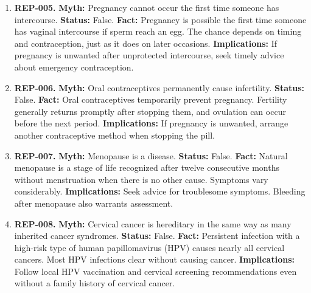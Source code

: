 \documentclass[11pt,oneside]{book}
\begin{document}
\begin{enumerate}[leftmargin=0pt,labelwidth=0pt,labelsep=0pt,itemindent=0pt]
\textbf{Implications:} Bleeding alone does not identify a day when unprotected intercourse is free of pregnancy risk.
\item[] \textbf{REP-005.} \textbf{Myth:} Pregnancy cannot occur the first time someone has intercourse.\newline
\textbf{Status:} False.\newline
\textbf{Fact:} Pregnancy is possible the first time someone has vaginal intercourse if sperm reach an egg. The chance depends on timing and contraception, just as it does on later occasions. \cite{ref253,ref323}\newline
\textbf{Implications:} If pregnancy is unwanted after unprotected intercourse, seek timely advice about emergency contraception.
\item[] \textbf{REP-006.} \textbf{Myth:} Oral contraceptives permanently cause infertility.\newline
\textbf{Status:} False.\newline
\textbf{Fact:} Oral contraceptives temporarily prevent pregnancy. Fertility generally returns promptly after stopping them, and ovulation can occur before the next period. \cite{ref323}\newline
\textbf{Implications:} If pregnancy is unwanted, arrange another contraceptive method when stopping the pill.
\item[] \textbf{REP-007.} \textbf{Myth:} Menopause is a disease.\newline
\textbf{Status:} False.\newline
\textbf{Fact:} Natural menopause is a stage of life recognized after twelve consecutive months without menstruation when there is no other cause. Symptoms vary considerably. \cite{ref324}\newline
\textbf{Implications:} Seek advice for troublesome symptoms. Bleeding after menopause also warrants assessment.
\item[] \textbf{REP-008.} \textbf{Myth:} Cervical cancer is hereditary in the same way as many inherited cancer syndromes.\newline
\textbf{Status:} False.\newline
\textbf{Fact:} Persistent infection with a high-risk type of human papillomavirus (HPV) causes nearly all cervical cancers. Most HPV infections clear without causing cancer. \cite{ref325}\newline
\textbf{Implications:} Follow local HPV vaccination and cervical screening recommendations even without a family history of cervical cancer.

\end{enumerate}
\end{document}
